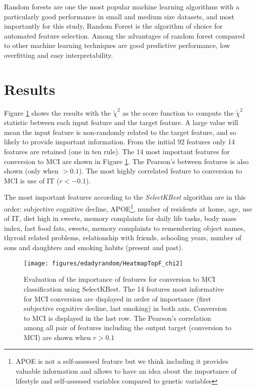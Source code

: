 \documentclass[preprint,12pt]{elsarticle}
\begin{document}
Random forests are one the most popular machine learning algorithms with a particularly good performance in small and medium size datasets, and most importantly for this study, Random Forest is the algorithm of choice for automated feature selection. 
Among the advantages of random forest compared to other machine learning techniques are good predictive performance, low overfitting and easy interpretability. 


\section{Results}
\label{se:res}

Figure \ref{fig:chi2} shows the results with the $\tilde{\chi}^2$ as the score function to compute the $\tilde{\chi}^2$ statistic between each input feature and the target feature. A large value will mean the input feature is non-randomly related to the target feature, and so likely to provide important information. 
From the initial 92 features only 14 features are retained (one in ten rule). The 14 most important features for conversion to MCI are shown in Figure \ref{fig:chi2}. The Pearson's between features is also shown (only when $>0.1$). The most highly correlated feature to conversion to MCI is use of IT ($r<-0.1$). 

The most important features according to the \emph{SelectKBest} algorithm are in this order: subjective cognitive decline, APOE\footnote{APOE is not a self-assessed feature but we think including it provides valuable information and allows to have an idea about the importance of lifestyle and self-assessed variables compared to genetic variables}, number of residents at home, age, use of IT, diet high in sweets, memory complaints for daily life tasks, body mass index, fast food fats, sweets, memory complaints to remembering object names, thyroid related problems, relationship with friends, schooling years, number of sons and daughters and smoking habits (present and past).  

\begin{figure}[!htb]
        \centering
        \texttt{[image: figures/edadyrandom/HeatmapTopF\_chi2]}
        \caption{Evaluation of the importance of features for conversion to MCI classification using SelectKBest. The 14 features most informative for MCI conversion are displayed in order of importance (first subjective cognitive decline, last smoking) in both axis. Conversion to MCI is displayed in the last row. The Pearson's correlation among all pair of features including the output target (conversion to MCI) are shown when $r>0.1$ } 
        \label{fig:chi2}
\end{figure}
\end{document}
